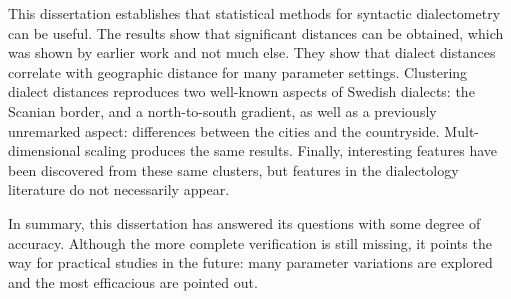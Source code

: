 This dissertation establishes that statistical methods for syntactic
dialectometry can be useful. The results show that significant
distances can be obtained, which was shown by earlier work and not
much else. They show that dialect distances correlate with geographic
distance for many parameter settings. Clustering dialect distances
reproduces two well-known aspects of Swedish dialects: the Scanian
border, and a north-to-south gradient, as well as a previously unremarked
aspect: differences between the cities and the
countryside. Mult-dimensional scaling produces the same
results. Finally, interesting features have been discovered from these
same clusters, but features in the dialectology literature do not
necessarily appear.

In summary, this dissertation has answered its questions with some
degree of accuracy. Although the more complete verification is still
missing, it points the way for practical studies in the future: many
parameter variations are explored and the most efficacious are pointed
out.

